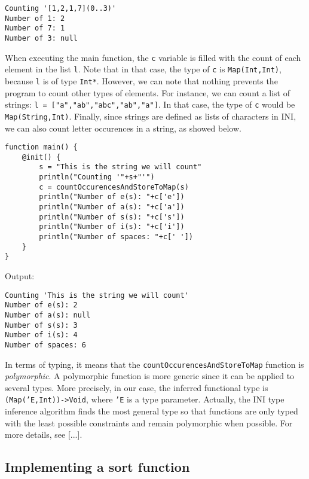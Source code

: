 \documentclass[11pt]{article}
\begin{document}
\begin{lstlisting}[numbers=none]
Counting '[1,2,1,7](0..3)'
Number of 1: 2
Number of 7: 1
Number of 3: null
\end{lstlisting}

When executing the main function, the \texttt{c} variable is filled with the count of each element in the list \texttt{l}. Note that in that case, the type of \texttt{c} is \texttt{Map(Int,Int)}, because \texttt{l} is of type \texttt{Int*}. However, we can note that nothing prevents the program to count other types of elements. For instance, we can count a list of strings: \texttt{l = ["a","ab","abc","ab","a"]}. In that case, the type of \texttt{c} would be \texttt{Map(String,Int)}. Finally, since strings are defined as lists of characters in INI, we can also count letter occurences in a string, as showed below.

\begin{lstlisting}
function main() {
	@init() {
		s = "This is the string we will count"
		println("Counting '"+s+"'")
		c = countOccurencesAndStoreToMap(s)
		println("Number of e(s): "+c['e'])
		println("Number of a(s): "+c['a'])
		println("Number of s(s): "+c['s'])
		println("Number of i(s): "+c['i'])
		println("Number of spaces: "+c[' '])
	}
}
\end{lstlisting}

Output:

\begin{lstlisting}[numbers=none]
Counting 'This is the string we will count'
Number of e(s): 2
Number of a(s): null
Number of s(s): 3
Number of i(s): 4
Number of spaces: 6
\end{lstlisting}

In terms of typing, it means that the \texttt{countOccurencesAndStoreToMap} function is \emph{polymorphic}. A polymorphic function is more generic since it can be applied to several types. More precisely, in our case, the inferred functional type is \texttt{(Map('E,Int))->Void}, where \texttt{'E} is a type parameter. Actually, the INI type inference algorithm finds the most general type so that functions are only typed with the least possible constraints and remain polymorphic when possible. For more details, see [...].

\subsection{Implementing a sort function\label{sec:implementing_a_sort_function}}
\end{document}
